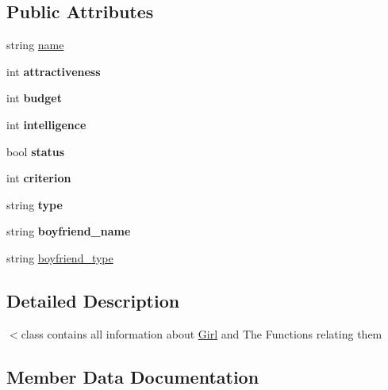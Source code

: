 \subsection*{Public Attributes}
\begin{DoxyCompactItemize}
\item 
string \hyperlink{class_girl_ace47c55f2f3bc3237f6acba40302b442}{name}
\item 
int {\bfseries attractiveness}\hypertarget{class_girl_ab97bd68f8bc0ab5ee3fb9d2784ed1474}{}\label{class_girl_ab97bd68f8bc0ab5ee3fb9d2784ed1474}

\item 
int {\bfseries budget}\hypertarget{class_girl_ae9b239496b3b58b0a5b79c498d23a3d5}{}\label{class_girl_ae9b239496b3b58b0a5b79c498d23a3d5}

\item 
int {\bfseries intelligence}\hypertarget{class_girl_a751f8b9d8f1ba139d3f512eb198c16f4}{}\label{class_girl_a751f8b9d8f1ba139d3f512eb198c16f4}

\item 
bool {\bfseries status}\hypertarget{class_girl_a8bc99d3c68fe3bbad96c0258b04ec107}{}\label{class_girl_a8bc99d3c68fe3bbad96c0258b04ec107}

\item 
int {\bfseries criterion}\hypertarget{class_girl_a1a2a395adc6fdf036a4487892ea4cebb}{}\label{class_girl_a1a2a395adc6fdf036a4487892ea4cebb}

\item 
string {\bfseries type}\hypertarget{class_girl_aa00a6dd4f7e8f3c8c1033757388a1226}{}\label{class_girl_aa00a6dd4f7e8f3c8c1033757388a1226}

\item 
string {\bfseries boyfriend\+\_\+name}\hypertarget{class_girl_a34799b1fc28284ec0c4084263d4a8021}{}\label{class_girl_a34799b1fc28284ec0c4084263d4a8021}

\item 
string \hyperlink{class_girl_a39f5234704c30029a76b251a1b41b41c}{boyfriend\+\_\+type}
\end{DoxyCompactItemize}


\subsection{Detailed Description}
$<$class contains all information about \hyperlink{class_girl}{Girl} and The Functions relating them 

\subsection{Member Data Documentation}
